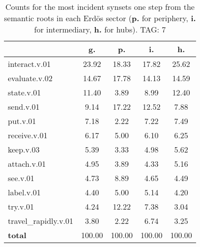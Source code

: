 \begin{table}[h!]
\begin{center}
\begin{tabular}{| l || c | c | c | c |}\hline
 & {\bf g.} & {\bf p.} & {\bf i.} & {\bf h.} \\\hline\hline
interact.v.01 & 23.92  & 18.33  & 17.82  & 25.62 \\\hline
evaluate.v.02 & 14.67  & 17.78  & 14.13  & 14.59 \\\hline
state.v.01 & 11.40  & 3.89  & 8.99  & 12.40 \\\hline
send.v.01 & 9.14  & 17.22  & 12.52  & 7.88 \\\hline
put.v.01 & 7.18  & 2.22  & 7.22  & 7.49 \\\hline
receive.v.01 & 6.17  & 5.00  & 6.10  & 6.25 \\\hline
keep.v.03 & 5.39  & 3.33  & 4.98  & 5.62 \\\hline
attach.v.01 & 4.95  & 3.89  & 4.33  & 5.16 \\\hline
see.v.01 & 4.73  & 8.89  & 4.65  & 4.49 \\\hline
label.v.01 & 4.40  & 5.00  & 5.14  & 4.20 \\\hline
try.v.01 & 4.24  & 12.22  & 7.38  & 3.04 \\\hline
travel\_rapidly.v.01 & 3.80  & 2.22  & 6.74  & 3.25 \\\hline\hline
{{\bf total}} & 100.00  & 100.00  & 100.00  & 100.00 \\\hline
\end{tabular}
\caption{Counts for the most incident synsets one step from the semantic roots in each Erd\"os sector ({\bf p.} for periphery, {\bf i.} for intermediary, {\bf h.} for hubs). TAG: 7}
\end{center}
\end{table}
